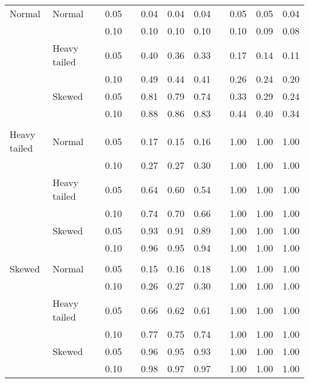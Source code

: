 \begin{table}[ht]
\begin{scriptsize}
\begin{center}
\begin{tabular}{ll p{.1cm} c p{.1cm} rrr p{.1cm} rrr}
\rowcolor{gray!20}Normal       & Normal       && 0.05 &&   0.04 & 0.04 & 0.04 && 0.05 & 0.05 & 0.04 \\ 
\rowcolor{gray!20}             &              && 0.10 &&   0.10 & 0.10 & 0.10 && 0.10 & 0.09 & 0.08 \\ 
\rowcolor{gray!20}             & Heavy tailed && 0.05 &&   0.40 & 0.36 & 0.33 && 0.17 & 0.14 & 0.11 \\ 
\rowcolor{gray!20}             &              && 0.10 &&   0.49 & 0.44 & 0.41 && 0.26 & 0.24 & 0.20 \\ 
\rowcolor{gray!20}             & Skewed       && 0.05 &&   0.81 & 0.79 & 0.74 && 0.33 & 0.29 & 0.24 \\ 
\rowcolor{gray!20}             &              && 0.10 &&   0.88 & 0.86 & 0.83 && 0.44 & 0.40 & 0.34 \\ 
             &&&&&&&&&&&\\
Heavy tailed & Normal       && 0.05 &&   0.17 & 0.15 & 0.16 && 1.00 & 1.00 & 1.00 \\ 
             &              && 0.10 &&   0.27 & 0.27 & 0.30 && 1.00 & 1.00 & 1.00 \\ 
             & Heavy tailed && 0.05 &&   0.64 & 0.60 & 0.54 && 1.00 & 1.00 & 1.00 \\ 
             &              && 0.10 &&   0.74 & 0.70 & 0.66 && 1.00 & 1.00 & 1.00 \\ 
             & Skewed       && 0.05 &&   0.93 & 0.91 & 0.89 && 1.00 & 1.00 & 1.00 \\ 
             &              && 0.10 &&   0.96 & 0.95 & 0.94 && 1.00 & 1.00 & 1.00 \\ 
             &&&&&&&&&&&\\
Skewed       & Normal       && 0.05 &&   0.15 & 0.16 & 0.18 && 1.00 & 1.00 & 1.00 \\ 
             &              && 0.10 &&   0.26 & 0.27 & 0.30 && 1.00 & 1.00 & 1.00 \\ 
             & Heavy tailed && 0.05 &&   0.66 & 0.62 & 0.61 && 1.00 & 1.00 & 1.00 \\ 
             &              && 0.10 &&   0.77 & 0.75 & 0.74 && 1.00 & 1.00 & 1.00 \\ 
             & Skewed       && 0.05 &&   0.96 & 0.95 & 0.93 && 1.00 & 1.00 & 1.00 \\ 
             &              && 0.10 &&   0.98 & 0.97 & 0.97 && 1.00 & 1.00 & 1.00 \\ 


   \hline
\end{tabular}
\end{center}
\end{scriptsize}
\end{table}

